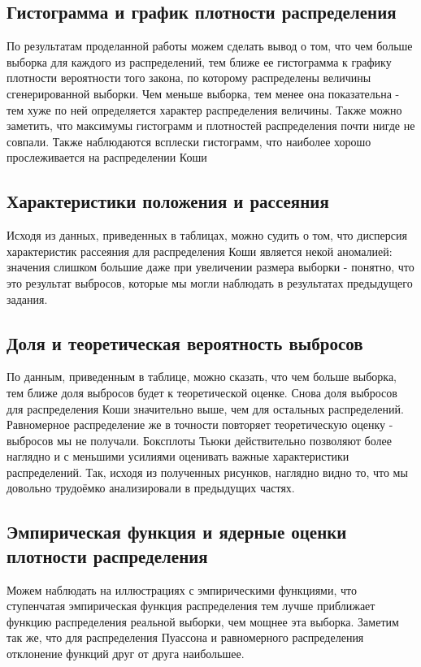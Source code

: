 \documentclass[../main.tex]{subfiles}
\begin{document}
    \subsection{Гистограмма и график плотности распределения}
    \noindent По результатам проделанной работы можем сделать вывод о том, что чем больше выборка для каждого из распределений, тем ближе ее гистограмма к графику плотности вероятности того закона, по которому распределены величины сгенерированной выборки. Чем меньше выборка, тем менее она показательна - тем хуже по ней определяется характер распределения величины. 
    \noindent Также можно заметить, что максимумы гистограмм и плотностей распределения почти нигде не совпали. Также наблюдаются всплески гистограмм, что наиболее хорошо прослеживается на распределении Коши

    
    \subsection{Характеристики положения и рассеяния}
    
    \noindent Исходя из данных, приведенных в таблицах, можно судить о том, что дисперсия характеристик рассеяния для распределения Коши является некой аномалией: значения слишком большие даже при увеличении размера выборки - понятно, что это результат выбросов, которые мы могли наблюдать в результатах предыдущего задания.


    \subsection{Доля и теоретическая вероятность выбросов}
    \noindent По данным, приведенным в таблице, можно сказать, что чем больше выборка, тем ближе доля выбросов будет к теоретической оценке. Снова доля выбросов для распределения Коши значительно выше, чем для остальных распределений. Равномерное распределение же в точности повторяет теоретическую оценку - выбросов мы не получали. 
    \noindent Боксплоты Тьюки действительно позволяют более наглядно и с меньшими усилиями оценивать важные характеристики распределений. Так, исходя из полученных рисунков, наглядно видно то, что мы довольно трудоёмко анализировали в предыдущих частях.

    \subsection{Эмпирическая функция и ядерные оценки плотности распределения}
    \noindent Можем наблюдать на иллюстрациях с эмпирическими функциями, что ступенчатая эмпирическая функция распределения тем лучше приближает функцию распределения реальной выборки, чем мощнее эта выборка. Заметим так же, что для распределения Пуассона и равномерного распределения отклонение функций друг от друга наибольшее.\\\\
\end{document}
